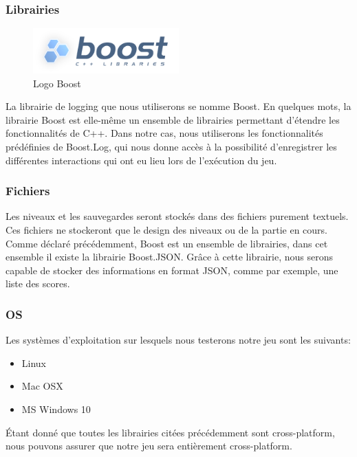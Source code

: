 \subsubsection{Librairies}
\begin{figure}[h]
	\centering
	\includegraphics[width=0.5\textwidth]{pictures/Boost_logo.png}
	\caption{Logo Boost}
	\label{fig:logo_boost}
\end{figure}
La librairie de logging que nous utiliserons se nomme Boost. En quelques mots, la librairie Boost est elle-même un ensemble de librairies permettant d'étendre les fonctionnalités de C++. Dans notre cas, nous utiliserons les fonctionnalités prédéfinies de Boost.Log, qui nous donne accès à la possibilité d'enregistrer les différentes interactions qui ont eu lieu lors de l'exécution du jeu.

\subsubsection{Fichiers}
Les niveaux et les sauvegardes seront stockés dans des fichiers purement textuels. Ces fichiers ne stockeront que le design des niveaux ou de la partie en cours.
Comme déclaré précédemment, Boost est un ensemble de librairies, dans cet ensemble il existe la librairie Boost.JSON. Grâce à cette librairie, nous serons capable de stocker des informations en format JSON, comme par exemple, une liste des scores.

\subsubsection{OS}
Les systèmes d'exploitation sur lesquels nous testerons notre jeu sont les suivants:
\begin{itemize}
	\item Linux
	\item Mac OSX
	\item MS Windows 10
\end{itemize}
Étant donné que toutes les librairies citées précédemment sont cross-platform, nous pouvons assurer que notre jeu sera entièrement cross-platform.
